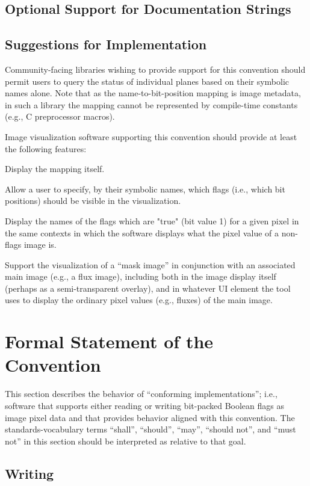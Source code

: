 \documentclass[DM,authoryear,toc]{lsstdoc}
\begin{document}
\subsection{Optional Support for Documentation Strings}

\subsection{Suggestions for Implementation}

Community-facing libraries wishing to provide support for this
convention should permit users to query the status of individual
planes based on their symbolic names alone.
Note that as the name-to-bit-position mapping is image metadata,
in such a library the mapping cannot be represented by compile-time
constants (e.g., C preprocessor macros).

Image visualization software supporting this convention should
provide at least the following features:

Display the mapping itself.

Allow a user to specify, by their symbolic names, which flags
(i.e., which bit positions) should be visible in the visualization.

Display the names of the flags which are "true" (bit value 1)
for a given pixel in the same contexts in which the software
displays what the pixel value of a non-flags image is.

Support the visualization of a ``mask image'' in conjunction
with an associated main image (e.g., a flux image), including
both in the image display itself (perhaps as a semi-transparent
overlay), and in whatever UI element the tool uses to display
the ordinary pixel values (e.g., fluxes) of the main image.

\section{Formal Statement of the Convention}

This section describes the behavior of ``conforming implementations'';
i.e., software that supports either reading or writing bit-packed
Boolean flags as image pixel data and that provides behavior aligned
with this convention.
The standards-vocabulary terms ``shall'', ``should'', ``may'',
``should  not'', and ``must not'' in this section should be interpreted
as relative to that goal.

\subsection{Writing}
\end{document}
